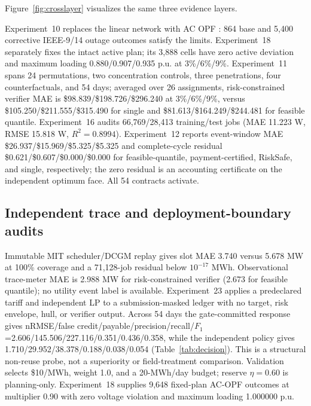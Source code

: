 \documentclass[10pt,journal]{IEEEtran}
\newcommand{\RiskSafe}{risk-constrained verifier}
\begin{document}
Figure~\ref{fig:crosslayer} visualizes the same three evidence layers.

Experiment~10 replaces the linear network with AC OPF
\cite{zimmerman2011matpower}: 864 base and 5,400 corrective IEEE-9/14 outage
outcomes satisfy the limits. Experiment~18 separately fixes the intact active
plan; its 3,888 cells have zero active deviation and maximum loading
0.880/0.907/0.935 p.u. at 3\%/6\%/9\%. Experiment~11 spans 24 permutations,
two concentration controls, three penetrations, four counterfactuals, and
54 days; averaged over 26 assignments, \RiskSafe{} MAE is
\$98.839/\$198.726/\$296.240 at 3\%/6\%/9\%, versus
\$105.250/\$211.555/\$315.490 for single and
\$81.613/\$164.249/\$244.481 for feasible quantile. Experiment~16 audits
66,769/28,413 training/test jobs (MAE 11.223 W, RMSE 15.818 W, $R^2=0.8994$).
Experiment~12 reports event-window MAE
\$26.937/\$15.969/\$5.325/\$5.325 and complete-cycle residual
\$0.621/\$0.607/\$0.000/\$0.000 for feasible-quantile,
payment-certified, RiskSafe, and single, respectively; the zero residual is an
accounting certificate on the independent optimum face. All 54 contracts
activate.

\subsection{Independent trace and deployment-boundary audits}

Immutable MIT scheduler/DCGM replay gives slot MAE 3.740 versus 5.678 MW at
100\% coverage and a 71,128-job residual below $10^{-17}$ MWh. Observational
trace-meter MAE is 2.988 MW for \RiskSafe{} (2.673 for feasible quantile);
no utility event label is available. Experiment~23 applies a predeclared tariff
and independent LP to a submission-masked ledger with no target, risk envelope,
hull, or verifier output. Across 54 days the
gate-committed response gives nRMSE/false credit/payable/precision/recall/$F_1$
=2.606/145.506/227.116/0.351/0.436/0.358, while the independent policy gives
1.710/29.952/38.378/0.188/0.038/0.054 (Table~\ref{tab:decision}). This is a
structural non-reuse probe, not a superiority or field-treatment comparison.
Validation selects \$10/MWh, weight 1.0, and a 20-MWh/day budget; reserve
$\eta=0.60$ is planning-only. Experiment~18 supplies 9,648 fixed-plan AC-OPF
outcomes at multiplier 0.90 with zero voltage violation and maximum loading
1.000000 p.u.
\end{document}
